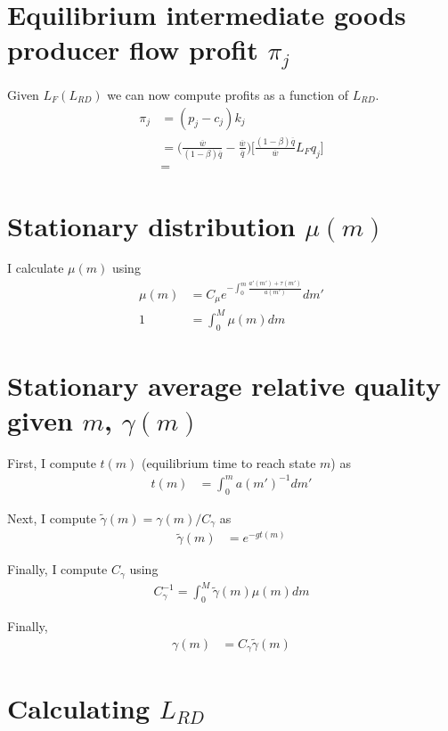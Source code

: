 \documentclass[12pt,english]{article}
\theoremstyle{remark}
\begin{document}
\section{Equilibrium intermediate goods producer flow profit $\pi_j$}

Given $L_F(L_{RD})$ we can now compute profits as a function of $L_{RD}$. 
\begin{align*}
	\pi_j &= (p_j - c_j) k_j \\
	      &= \Big( \frac{\overline{w}}{(1-\beta)\overline{q}} - \frac{\overline{w}}{\overline{q}} \Big) \Big[ \frac{(1-\beta) \overline{q}}{\overline{w}} L_F q_j  \Big] \\
	      &= 
\end{align*}

\section{Stationary distribution $\mu(m)$}

I calculate $\mu(m)$ using 
\begin{align*}
	\mu(m) &= C_{\mu} e^{-\int_0^m \frac{a'(m') + \tau(m')}{a(m')}}dm' \\
	1 &= \int_0^{M} \mu(m)dm
\end{align*}

\section{Stationary average relative quality given $m$, $\gamma(m)$}

First, I compute $t(m)$ (equilibrium time to reach state $m$) as 
\begin{align*}
t(m) &= \int_0^m a(m')^{-1} dm' 
\end{align*}

Next, I compute $\tilde{\gamma}(m) = \gamma(m) / C_{\gamma}$ as 
\begin{align*}
	\tilde{\gamma}(m) &= e^{-gt(m)}
\end{align*}

Finally, I compute $C_{\gamma}$ using 
\begin{align*}
	C_{\gamma}^{-1} = \int_0^{M} \tilde{\gamma}(m) \mu(m) dm
\end{align*}

Finally, 
\begin{align*}
	\gamma(m) &= C_{\gamma} \tilde{\gamma}(m) 
\end{align*}

\section{Calculating $L_{RD}$}
\end{document}
